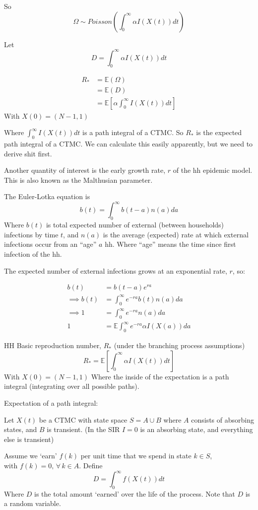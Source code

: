 \documentclass{X:/Documents/Coding/Latex/myassignment}
\begin{document}
So
\[\Omega \sim Poisson\left(\int_0^\infty \alpha I(X(t))dt\right)\]

Let 
\[D = \int_0^\infty \alpha I(X(t))dt\]

\begin{align*}
    R_* &= \mathbb{E}(\Omega)\\
    &= \mathbb{E}(D)\\
    &= \mathbb{E}\left[\alpha \int_0^\infty I(X(t))dt\right]
\end{align*}
With $X(0) = (N-1,1)$

Where $\int_0^\infty I(X(t))dt$ is a path integral of a CTMC.
So $R_*$ is the expected path integral of a CTMC.
We can calculate this easily apparently, but we need to derive shit first.


Another quantity of interest is the early growth rate, $r$ of the hh epidemic model. This is also known as the Malthusian parameter.

The Euler-Lotka equation is
\[b(t) = \int_0^\infty b(t-a) n(a) da\]
Where $b(t)$ is total expected number of external (between households) infections by time $t$, and $n(a)$ is the average (expected) rate at which external infections occur from an ``age'' $a$ hh. Where ``age'' means the time since first infection of the hh. 

The expected number of external infections grows at an exponential rate, $r$, so:

\begin{align*}
    b(t) &= b(t-a) e^{ra}\\
    \implies b(t) &= \int_0^\infty e^{-ra} b(t) n(a) da\\
    \implies 1 &= \int_0^\infty e^{-ra} n(a) da\\
    1 &= \mathbb{E} \int_0^\infty e^{-ra} \alpha I(X(a)) da
\end{align*}




HH Basic reproduction number, $R_*$ (under the branching process assumptions)
\[R_* = \mathbb{E} \left[\int_0^\infty \alpha I(X(t)) dt\right]\]
With $X(0) = (N-1,1)$
Where the inside of the expectation is a path integral (integrating over all possible paths).


Expectation of a path integral:

Let $X(t)$ be a CTMC with state space $S = A \cup B$ where $A$ consists of absorbing states, and $B$ is transient. (In the SIR $I=0$ is an absorbing state, and everything else is transient)

Assume we `earn' $f(k)$ per unit time that we spend in state $k\in S$, \\
with $f(k) = 0,\,\forall\, k\in A$.
Define
\[D = \int_0^\infty f(X(t)) dt\]
Where $D$ is the total amount `earned' over the life of the process. Note that $D$ is a random variable.
\end{document}
